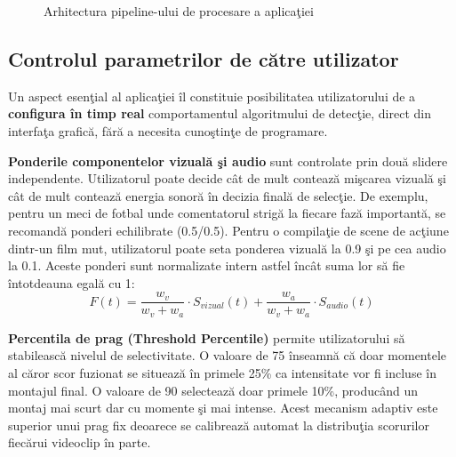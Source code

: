 \documentclass[12pt,a4paper]{article}
\begin{document}
\begin{figure}[H]
    \caption{Arhitectura pipeline-ului de procesare a aplica\c{t}iei}
    \label{fig:pipeline}
\end{figure}

\subsection{Controlul parametrilor de c\u{a}tre utilizator}

Un aspect esen\c{t}ial al aplica\c{t}iei \^{i}l constituie posibilitatea utilizatorului de a \textbf{configura \^{i}n timp real} comportamentul algoritmului de detec\c{t}ie, direct din interfa\c{t}a grafic\u{a}, f\u{a}r\u{a}{} a necesita cuno\c{s}tin\c{t}e de programare.

\textbf{Ponderile componentelor vizual\u{a}{} \c{s}i audio} sunt controlate prin dou\u{a}{} slidere independente. Utilizatorul poate decide c\^{a}t de mult conteaz\u{a}{} mi\c{s}carea vizual\u{a}{} \c{s}i c\^{a}t de mult conteaz\u{a}{} energia sonor\u{a}{} \^{i}n decizia final\u{a}{} de selec\c{t}ie. De exemplu, pentru un meci de fotbal unde comentatorul strig\u{a}{} la fiecare faz\u{a}{} important\u{a}, se recomand\u{a}{} ponderi echilibrate (0.5/0.5). Pentru o compila\c{t}ie de scene de ac\c{t}iune dintr-un film mut, utilizatorul poate seta ponderea vizual\u{a}{} la 0.9 \c{s}i pe cea audio la 0.1. Aceste ponderi sunt normalizate intern astfel \^{i}nc\^{a}t suma lor s\u{a}{} fie \^{i}ntotdeauna egal\u{a}{} cu 1:
\begin{equation}
    F(t) = \frac{w_v}{w_v + w_a} \cdot S_{vizual}(t) + \frac{w_a}{w_v + w_a} \cdot S_{audio}(t)
\end{equation}

\textbf{Percentila de prag (Threshold Percentile)} permite utilizatorului s\u{a}{} stabileasc\u{a}{} nivelul de selectivitate. O valoare de 75 \^{i}nseamn\u{a}{} c\u{a}{} doar momentele al c\u{a}ror scor fuzionat se situeaz\u{a}{} \^{i}n primele 25\% ca intensitate vor fi incluse \^{i}n montajul final. O valoare de 90 selecteaz\u{a}{} doar primele 10\%, produc\^{a}nd un montaj mai scurt dar cu momente \c{s}i mai intense. Acest mecanism adaptiv este superior unui prag fix deoarece se calibreaz\u{a}{} automat la distribu\c{t}ia scorurilor fiec\u{a}rui videoclip \^{i}n parte.
\end{document}
